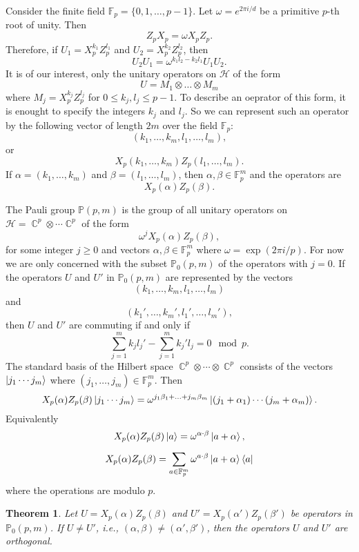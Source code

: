 \documentclass[a4paper]{article}
\DeclareMathOperator{\C}{\mathbb{C}}
\newtheorem{theorem}{Theorem}
\begin{document}
  Consider the finite field $\mathbb F_p =
  \{0,1,\ldots,p-1\}$. Let $\omega = e^{2\pi i / d}$ be a
  primitive $p$-th root of unity. Then
  \[
    Z_p X_p = \omega X_p Z_p.
  \] 
  Therefore, if $U_1 = X_p^{k_1} Z_p^{l_1}$ and $U_2 =
  X_p^{k_2}Z_p^{l_2}$, then
  \[
    U_2 U_1 = \omega^{k_1l_2 - k_2l_1} U_1 U_2.
  \] 
  It is of our interest, only the unitary operators on
  $\mathcal{H}$ of the form
  \[
    U = M_1 \otimes \ldots \otimes M_m
  \] 
  where $M_j = X_p^{k_j} Z_p^{l_j}$ for $0 \leq k_j,l_j \leq
  p - 1$. To describe an oeprator of this form, it is
  enought to specify the integers $k_j$ and $l_j$. So we can
  represent such an operator by the following vector of
  length $2m$ over the field $\mathbb F_p$:
  \[
    (k_1,\ldots,k_m,l_1,\ldots,l_m),
  \] 
  or
  \[
    X_p(k_1,\ldots,k_m)Z_p(l_1,\ldots,l_m).
  \] 
  If $\alpha = (k_1,\ldots,k_m)$ and $\beta =
  (l_1,\ldots,l_m)$, then $\alpha, \beta \in \mathbb
  F_p^{m}$ and the operators are
  \[
    X_p(\alpha) Z_p(\beta).
  \] 

  The Pauli group $\mathbb P(p,m)$ is the group of all
  unitary operators on $\mathcal{H} = \C^{p} \otimes \cdots
  \C^{p}$ of the form
  \[
    \omega^{j} X_p(\alpha) Z_p(\beta),
  \] 
  for some integer $j \geq 0$ and vectors $\alpha, \beta \in
  \mathbb F_p^{m}$ where $\omega = \exp(2\pi i / p)$. For
  now we are only concerned with the subset $\mathbb
  P_0(p,m)$ of the operators with $j = 0$. If the operators
  $U$ and $U'$ in $\mathbb P_0(p,m)$ are represented by the
  vectors
  \[
    (k_1,\ldots,k_m,l_1,\ldots,l_m)
  \] 
  and
  \[
    (k_1',\ldots,k_m',l_1',\ldots,l_m'),
  \] 
  then $U$ and $U'$ are commuting if and only if
  \[
    \sum_{j=1}^{m} k_j l_j' - \sum_{j=1}^{m} k_j'l_j = 0
    \mod p.
  \] 
  The standard basis of the Hilbert space $\C^{p} \otimes
  \cdots \otimes \C^{p}$ consists of the vectors $\ket{j_1
  \cdots j_m}$ where $(j_1,\ldots,j_m) \in \mathbb
  F_p^{m}$. Then
  \[
    X_p(\alpha)Z_p(\beta) \ket{j_1\cdots j_m}
    = \omega^{j_1\beta_1+\ldots+j_m\beta_m}
    \ket{(j_1+\alpha_1)\cdots(j_m+\alpha_m)}.
  \] 
  Equivalently
  \[
    X_p(\alpha)Z_p(\beta)\ket a
    = \omega^{\alpha \cdot \beta} \ket{a+\alpha},
  \] 
  \[
    X_p(\alpha)Z_p(\beta)
    = \sum_{a \in \mathbb F_p^{m}}^{} \omega^{a \cdot \beta}
    \ket{a+\alpha} \bra{a}
  \] 
  where the operations are modulo $p$.

  \begin{theorem}
    Let $U = X_p(\alpha)Z_p(\beta)$ and $U' =
    X_p(\alpha')Z_p(\beta')$ be operators in $\mathbb
    P_0(p,m)$. If $U \neq U'$, i.e., $(\alpha,\beta) \neq
    (\alpha',\beta')$, then the operators $U$ and $U'$ are
    orthogonal.
  \end{theorem}
\end{document}
